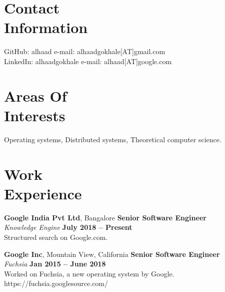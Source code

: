 \documentclass[margin,line]{resume}
\begin{document}
\begin{resume}

    \section{\mysidestyle Contact\\Information}

    GitHub: alhaad                            \hfill e-mail: alhaadgokhale[AT]gmail.com          \vspace{0mm}\\\vspace{0mm}%
    LinkedIn: alhaadgokhale                   \hfill e-mail: alhaad[AT]google.com  \vspace{0mm}\\\vspace{-4.5mm}%


    \section{\mysidestyle Areas Of\\Interests}

    Operating systems, Distributed systems, Theoretical computer science.

    \section{\mysidestyle Work\\Experience}

    \textbf{Google India Pvt Ltd}, Bangalore \hfill \textbf{Senior Software Engineer} \vspace{2mm}\\\vspace{1mm}%
    \textsl{Knowledge Engine} \hfill \textbf{July 2018 -- Present}\\
    Structured search on Google.com.
 
    \textbf{Google Inc}, Mountain View, California \hfill \textbf{Senior Software Engineer} \vspace{2mm}\\\vspace{1mm}%
    \textsl{Fuchsia} \hfill \textbf{Jan 2015 -- June 2018}\\
    Worked on Fuchsia, a new operating system by Google.
    https://fuchsia.googlesource.com/


\end{resume}
\end{document}
